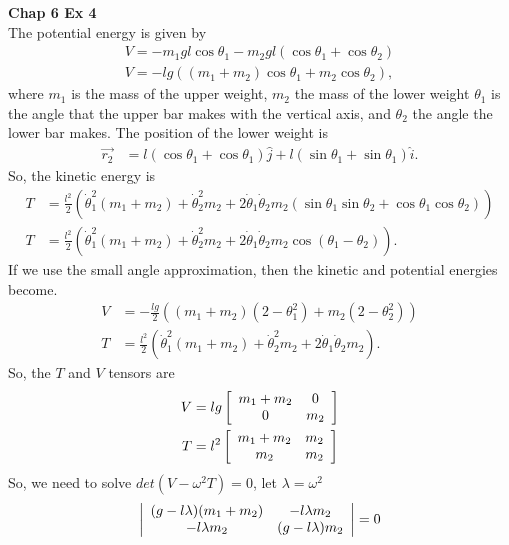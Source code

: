 \documentclass[10pt]{article}
\begin{document}
\textbf{Chap 6 Ex 4}\\
The potential energy is given by 
\begin{align*}
  V = -m_1gl\cos\theta_1-m_2gl(\cos\theta_1+\cos\theta_2)\\
  V = -lg\left( (m_1+m_2)\cos\theta_1 + m_2\cos\theta_2 \right),
\end{align*}
where $m_1$ is the mass of the upper weight, $m_2$ the mass of the lower weight
$\theta_1$ is the angle that the upper bar makes with the vertical axis, and
$\theta_2$ the angle the lower bar makes.  The position of the lower weight is
\begin{align*}
  \vec{r_2} &= l(\cos\theta_1+\cos\theta_1)\hat j + l(\sin\theta_1+\sin\theta_1)\hat i.
\end{align*}
So, the kinetic energy is
\begin{align*}
  T &= \frac{l^2}{2}\left( \dot\theta_1^2(m_1+m_2) + \dot\theta_2^2m_2 + 2\dot\theta_1\dot\theta_2m_2(\sin\theta_1\sin\theta_2+\cos\theta_1\cos\theta_2) \right)\\
  T &= \frac{l^2}{2}\left( \dot\theta_1^2(m_1+m_2) + \dot\theta_2^2m_2 + 2\dot\theta_1\dot\theta_2m_2\cos(\theta_1-\theta_2) \right).
\end{align*}
If we use the small angle approximation, then the kinetic and potential energies become.
\begin{align*}
  V &= -\frac{lg}{2}\left( (m_1+m_2)(2-\theta_1^2) + m_2(2-\theta_2^2) \right)\\
  T &= \frac{l^2}{2}\left( \dot\theta_1^2(m_1+m_2) + \dot\theta_2^2m_2 + 2\dot\theta_1\dot\theta_2m_2 \right).
\end{align*}
So, the $T$ and $V$ tensors are
\begin{align*}
  V &= 
  lg
  \left[
  \begin{array}[h]{c c}
    m_1+m_2 & 0\\
    0       & m_2\\
  \end{array}
  \right]\\
  T &= 
  l^2
  \left[
  \begin{array}[h]{c c}
    m_1+m_2 & m_2\\
    m_2     & m_2\\
  \end{array}
  \right]
\end{align*}
So, we need to solve $det(V-\omega^2 T)=0$, let $\lambda=\omega^2$
\begin{align*}
  \left|
  \begin{array}[h]{c c}
    (g-l\lambda)(m_1+m_2) & -l\lambda m_2\\
    -l\lambda m_2         & (g-l\lambda)m_2\\
  \end{array}
  \right| &= 0\\
\end{align*}
\end{document}
